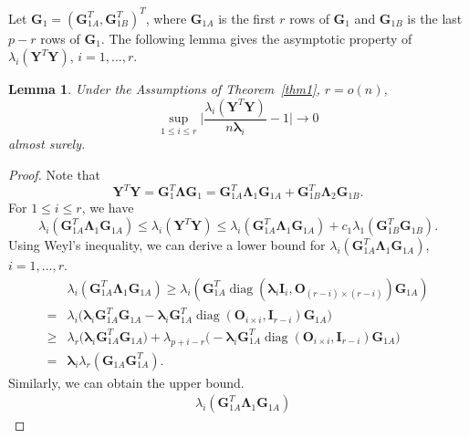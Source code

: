 \documentclass[12pt]{article} %
\DeclareMathOperator{\mydiag}{diag}
\newcommand{\bA}{\mathbf{A}}
\newcommand{\bY}{\mathbf{Y}}
\newcommand{\bG}{\mathbf{G}}
\newcommand{\bO}{\mathbf{O}}
\newcommand{\bI}{\mathbf{I}}
\newcommand{\bD}{\mathbf{D}}
\newcommand{\bV}{\mathbf{V}}
\newcommand{\bfsym}[1]{\ensuremath{\boldsymbol{#1}}}
\def\blambda {\bfsym {\lambda}}
\def\bLambda {\bfsym {\Lambda}}
\newtheorem{lemma}{Lemma}
\theoremstyle{definition}
\begin{document}
Let $\bG_1=(\bG_{1A}^T,\bG_{1B}^T)^T$, where $\bG_{1A}$ is the first $r$ rows of $\bG_1$ and $\bG_{1B}$ is the last $p-r$ rows of $\bG_1$.
The following lemma gives the asymptotic property of $\lambda_{i}(\bY^T \bY)$, $i=1,\ldots, r$.
\begin{lemma}\label{PCAlemma1}
    Under the Assumptions of Theorem~\ref{thm1}, $r=o(n)$,
    $$\sup_{1\leq i\leq r}\Big|\frac{\lambda_{i}(\bY^T \bY)}{n\blambda_i}-1\Big|\to 0$$
    almost surely.
\end{lemma}
\begin{proof}
    Note that
$$
\bY^T \bY =\bG_1^T \bLambda \bG_1
=
\bG_{1A}^T \bLambda_1 \bG_{1A}+
\bG_{1B}^T \bLambda_2 \bG_{1B}.
$$
For $1\leq i \leq r$, we have
    \begin{equation}\label{eq:DLU}
\lambda_i(\bG_{1A}^T \bLambda_1 \bG_{1A})
    \leq \lambda_i(\bY^T \bY) \leq \lambda_i(\bG_{1A}^T \bLambda_1 \bG_{1A})+
    c_1 \lambda_1(\bG_{1B}^T  \bG_{1B}).
    \end{equation}
 Using Weyl's inequality, we can derive a lower bound for $\lambda_i(\bG_{1A}^T \bLambda_1 \bG_{1A})$, $ i=1,\ldots, r$.
\begin{equation}\label{eq:DLower}
\begin{aligned}
&\lambda_i(\bG_{1A}^T \bLambda_1 \bG_{1A})
\geq
\lambda_i(\bG_{1A}^T \mydiag(\blambda_i \bI_{i},\bO_{(r-i)\times(r-i)}) \bG_{1A})
\\
    =&
    \lambda_i\Big( \blambda_i \bG_{1A}^T \bG_{1A}-\blambda_i\bG_{1A}^T \mydiag(\bO_{i\times i}, \bI_{r-i}) \bG_{1A}\Big)\\
    \geq&
    \lambda_r\Big( \blambda_i \bG_{1A}^T \bG_{1A}\Big)+\lambda_{p+i-r}\Big(-\blambda_i\bG_{1A}^T \mydiag(\bO_{i\times i}, \bI_{r-i}) \bG_{1A}\Big)\\
= &
\blambda_i \lambda_r(\bG_{1A}\bG_{1A}^T).
\end{aligned}
\end{equation}
Similarly, we can obtain the upper bound.
\begin{equation}\label{eq:DUpper}
\begin{aligned}
&\lambda_i(\bG_{1A}^T \bLambda_1 \bG_{1A})

\end{aligned}
\end{equation}
\end{proof}
\end{document}
